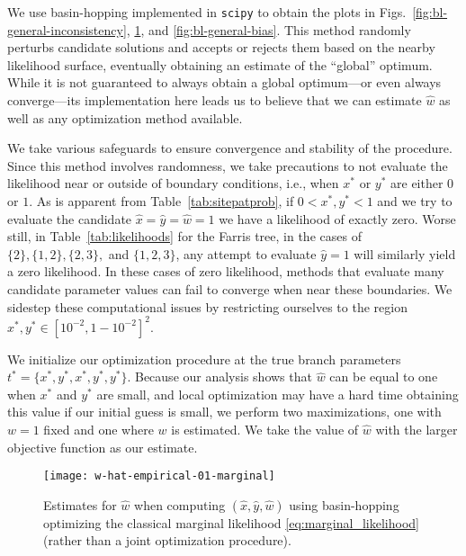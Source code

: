 We use basin-hopping \citep{Wales1997} implemented in \texttt{scipy} \citep{Jones2001} to obtain the plots in Figs.~\ref{fig:bl-general-inconsistency}, \ref{fig:bl-general-marginal}, and \ref{fig:bl-general-bias}.
This method randomly perturbs candidate solutions and accepts or rejects them based on the nearby likelihood surface, eventually obtaining an estimate of the ``global'' optimum.
While it is not guaranteed to always obtain a global optimum---or even always converge---its implementation here leads us to believe that we can estimate $\hat{w}$ as well as any optimization method available.

We take various safeguards to ensure convergence and stability of the procedure.
Since this method involves randomness, we take precautions to not evaluate the likelihood near or outside of boundary conditions, i.e., when $x^*$ or $y^*$ are either $0$ or $1$.
As is apparent from Table~\ref{tab:sitepatprob}, if $0 < x^*, y^* < 1$ and we try to evaluate the candidate $\hat{x}=\hat{y}=\hat{w}=1$ we have a likelihood of exactly zero.
Worse still, in Table~\ref{tab:likelihoods} for the Farris tree, in the cases of $\{2\}, \{1,2\}, \{2,3\},$ and $\{1,2,3\}$, any attempt to evaluate $\hat{y}=1$ will similarly yield a zero likelihood.
In these cases of zero likelihood, methods that evaluate many candidate parameter values can fail to converge when near these boundaries.
We sidestep these computational issues by restricting ourselves to the region $x^*,y^*\in [10^{-2},1-10^{-2}]^2$.

We initialize our optimization procedure at the true branch parameters $t^*=\{x^*,y^*,x^*,y^*,y^*\}$.
Because our analysis shows that $\hat{w}$ can be equal to one when $x^*$ and $y^*$ are small, and local optimization may have a hard time obtaining this value if our initial guess is small, we perform two maximizations, one with $w=1$ fixed and one where $w$ is estimated.
We take the value of $\hat{w}$ with the larger objective function as our estimate.

\begin{figure}
\centering
\texttt{[image: w-hat-empirical-01-marginal]}
\caption{
    Estimates for $\hat{w}$ when computing $(\hat{x}, \hat{y}, \hat{w})$ using basin-hopping \citep{Wales1997} optimizing the classical marginal likelihood \eqref{eq:marginal_likelihood} (rather than a joint optimization procedure).
}
\label{fig:bl-general-marginal}
\end{figure}

